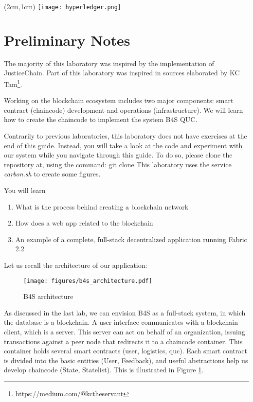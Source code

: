 \documentclass[12pt,a4paper]{article}
\theoremstyle{definition}
\begin{document}
\textblockorigin{-34pt}{-12pt}
\begin{textblock*}{10cm}(2cm,1cm)
\texttt{[image: hyperledger.png]}
\end{textblock*}
\newtheorem{mydef}{Definition}

\section*{Preliminary Notes}
The majority of this laboratory was inspired by the implementation of JusticeChain\cite{belchior2019_audits}. Part of this laboratory was inspired in sources elaborated by KC Tam\footnote{https://medium.com/@kctheservant}.

Working on the blockchain ecosystem includes two major components: smart contract (chaincode) development and operations (infrastructure). We will learn how to create the chaincode to implement the system B4S QUC.

Contrarily to previous laboratories, this laboratory does not have exercises at the end of this guide. Instead, you will take a look at the code and experiment with our system while you navigate through this guide.
To do so, please clone the repository at, using the command:
{git clone}
This laboratory uses the service \emph{carbon.sh} to create some figures.

You will learn
\begin{enumerate}
\item What is the process behind creating a blockchain network
\item How does a web app related to the blockchain
\item An example of a complete, full-stack decentralized application running Fabric 2.2
\end{enumerate}

Let us recall the architecture of our application:


\begin{figure}[h]
\centering
\texttt{[image: figures/b4s\_architecture.pdf]}
\caption{B4S architecture}
\label{fig:b4s}
\end{figure}

As discussed in the last lab, we can envision B4S as a full-stack system, in which the database is a blockchain. A user interface communicates with a blockchain client, which is a server. This server can act on behalf of an organization, issuing transactions against a peer node that redirects it to a chaincode container. This container holds several smart contracts (user, logistics, quc). Each smart contract is divided into the basic entities (User, Feedback), and useful abstractions help us develop chaincode (State, Statelist). This is illustrated in Figure \ref{fig:b4s}.
\end{document}
